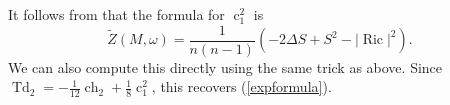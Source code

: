 \documentclass[12pt,reqno,a4paper]{amsart}
\numberwithin{equation}{section}
\DeclareMathOperator{\Td}{Td}
\DeclareMathOperator{\ch}{ch}
\DeclareMathOperator{\cc}{c}
\DeclareMathOperator{\ric}{Ric}
\theoremstyle{definition}
\theoremstyle{remark}
\begin{document}
It follows from \cite[Example 2.6]{dervan2023universal} that the formula for $\cc_1^2$ is
\begin{equation*}
\widetilde{Z}(M,\omega)=\frac{1}{n(n-1)}(-2\Delta S +S^2 -|\ric|^2).
\end{equation*}
We can also compute this directly using the same trick as above. Since $\Td_2=-\frac{1}{12}\ch_2+\frac{1}{8}\cc_1^2$, this recovers (\ref{expformula}).



\end{document}
